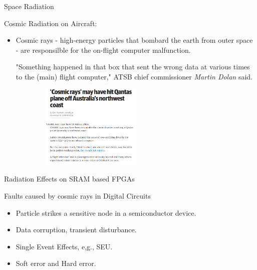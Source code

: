 \documentclass[aspectratio=1610]{beamer}
\begin{document}
\begin{frame}{Space Radiation}

\begin{block} {Cosmic Radiation on Aircraft:}

\end{block}

\begin{itemize}
\item \bf{Cosmic rays - high-energy particles that bombard the earth from outer space - are responsilble for the on-flight computer malfunction.

"Something happened in that box that sent the wrong data at various times to the (main) flight computer," ATSB chief commissioner \textit{Martin Dolan} said.}
\end{itemize}

\begin{figure}[]
\centering
   
  
   \includegraphics[width=7cm, height=4cm]{images/qantas.png}
\label{fig:tv}
\end{figure}

\end{frame}


\begin{frame}{Radiation Effects on SRAM based FPGAs}

\vspace{-2.0cm}
\begin{block}{Faults caused by cosmic rays in Digital Circuits}

\end{block}
\begin{itemize}

\item Particle strikes a sensitive node in a semiconductor device.
\item Data corruption, transient disturbance.

\item Single Event Effects, e,g., SEU.

\item Soft error and Hard error.

\end{itemize}










\end{frame}
\end{document}
